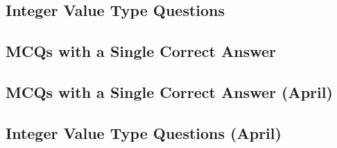 \subsection*{Integer Value Type Questions}
\begin{enumerate}[label=\thechapter.\arabic*,ref=\thechapter.\theenumi]



\end{enumerate}

\subsection*{MCQs with a Single Correct Answer}
\begin{enumerate}[label=\thechapter.\arabic*,ref=\thechapter.\theenumi]



\end{enumerate}

\subsection*{MCQs with a Single Correct Answer (April)}
\begin{enumerate}[label=\thechapter.\arabic*,ref=\thechapter.\theenumi]



\end{enumerate}

\subsection*{Integer Value Type Questions (April)}
\begin{enumerate}[label=\thechapter.\arabic*,ref=\thechapter.\theenumi]



\end{enumerate}
